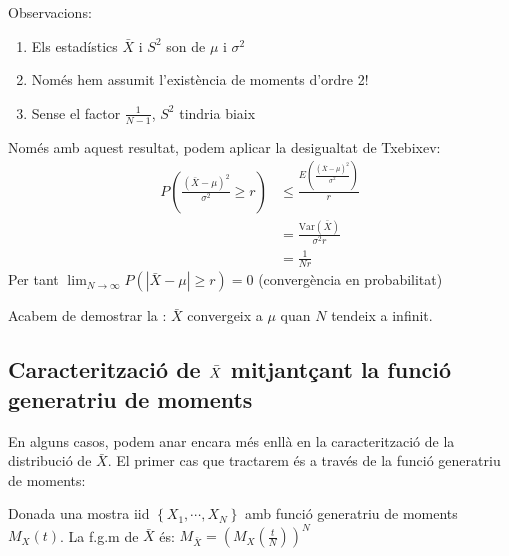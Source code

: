 \documentclass[letterpaper,10pt,english]{sphinxmanual}
\begin{document}
Observacions:
\begin{enumerate}
%
\item {} 
Els estadístics \(\bar{X}\) i \(S^2\) son  de \(\mu\) i \(\sigma^2\)

\item {} 
Només hem assumit l’existència de moments d’ordre 2!

\item {} 
Sense el factor \(\frac{1}{N-1}\), \(S^2\) tindria biaix

\end{enumerate}

Només amb aquest resultat, podem aplicar la desigualtat de Txebixev:
\begin{equation*}
\begin{split}P\left(\frac{\left(\bar{X} - \mu\right)^2}{\sigma^2} \geq r \right) & \leq \frac{E \left(\frac{\left(\bar{X} - \mu\right)^2}{\sigma^2} \right)}{r} \\
                                                                    & =  \frac{\mbox{Var}\left(\bar{X}\right)}{\sigma^2 r} \\
                                                                    & = \frac{1}{ N r}\end{split}
\end{equation*}
Per tant \(\lim_{N \to \infty} P\left(\left|\bar{X} - \mu\right| \geq r \right) = 0\) (convergència en probabilitat)

Acabem de demostrar la : \(\bar{X}\) convergeix a \(\mu\) quan \(N\) tendeix a infinit.


\subsection{Caracterització de \protect\(\bar{X}\protect\) mitjantçant la funció generatriu de moments}
\label{\detokenize{0_Intro/0_2_Intro_stats:caracteritzacio-de-bar-x-mitjantcant-la-funcio-generatriu-de-moments}}
En alguns casos, podem anar encara més enllà en la caracterització de la
distribució de \(\bar{X}\). El primer cas que tractarem és a través
de la funció generatriu de moments:

 Donada una mostra iid \(\left\{X_1, \cdots, X_N\right\}\) amb funció
generatriu de moments \(M_X(t)\). La f.g.m de \(\bar{X}\) és: \(M_{\bar{X}} = \left(M_{X}(\frac{t}{N})\right)^N\)
\end{document}

